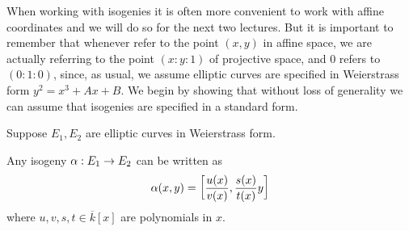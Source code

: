 




When working with isogenies it is often more convenient to work with affine coordinates and we will do so for the next two lectures.
But it is important to remember that whenever refer to the point $(x,y)$ in affine space, we are actually referring to the point $(x:y:1)$ of projective space, and $0$ refers to $(0:1:0)$, since, as usual, we assume elliptic curves are specified in Weierstrass form $y^2 = x^3+Ax+B$.
We begin by showing that without loss of generality we can assume that isogenies are specified in a standard form.

\begin{lem}\label{lem:hom-ec}
Suppose $E_1,E_2$ are elliptic curves in Weierstrass form.

Any isogeny $\alpha:E_1\to E_2$ can be written as
\[
\alpha(x,y)=\left[ {\frac{u(x)}{v(x)}, \frac{s(x)}{t(x)}y} \right]
\]
%
where $u,v,s,t \in \overline{k}[x]$ are polynomials in $x$.
\end{lem}

